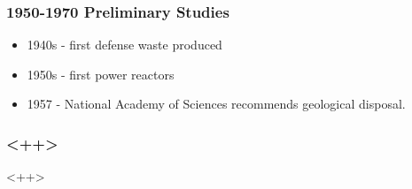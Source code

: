 
\begin{frame}[ctb!]
  \frametitle{1950-1970 Preliminary Studies}
  \begin{itemize}
    \item 1940s - first defense waste produced
    \item 1950s - first power reactors
    \item 1957 - National Academy of Sciences recommends geological disposal.
  \end{itemize}
\end{frame}


\begin{frame}[<+ctb!+>]
  \frametitle{<++>}
\end{frame}<++>

